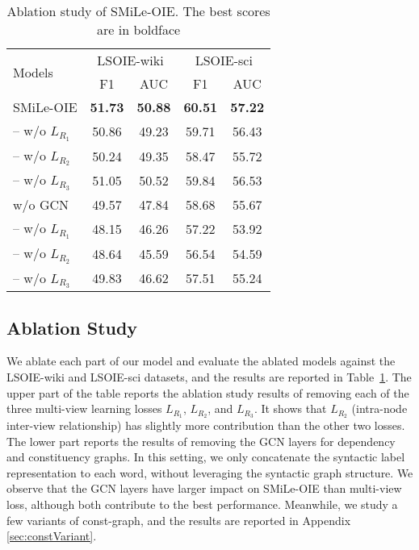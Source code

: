 \documentclass[11pt]{article}
\newcommand{\mname}{SMiLe-OIE\xspace}
\begin{document}
\begin{table}
\centering
    \begin{tabular}{l|cc|cc}
    \toprule
    \multirow{2}{*}{Models} &
    \multicolumn{2}{c|}{LSOIE-wiki} &
    \multicolumn{2}{c}{LSOIE-sci}\\
      & F1 & AUC & F1 & AUC\\
    \midrule
    \mname & \textbf{51.73} & \textbf{50.88} & \textbf{60.51} & \textbf{57.22}\\
    -- w/o $L_{R_1}$  & 50.86 & 49.23         & 59.71 & 56.43  \\
    -- w/o $L_{R_2}$ & 50.24 & 49.35         & 58.47 & 55.72      \\
    -- w/o $L_{R_3}$ & 51.05 & 50.52          & 59.84  & 56.53 \\
    \midrule
    w/o GCN  & 49.57 & 47.84         & 58.68 & 55.67     \\
    -- w/o $L_{R_1}$ & 48.15 & 46.26         & 57.22  &  53.92       \\
    -- w/o $L_{R_2}$ & 48.64 & 45.59         & 56.54  &  54.59     \\
    -- w/o $L_{R_3}$ & 49.83 & 46.62         & 57.51  & 55.24        \\
    \bottomrule
    \end{tabular}
\caption{Ablation study of \mname. The best scores are in boldface}
\label{tab:ablation}
\end{table}


\subsection{Ablation Study}
We ablate each part of our model and evaluate the ablated models against the LSOIE-wiki and LSOIE-sci datasets, and the results are reported in Table~\ref{tab:ablation}. 
The upper part of the table reports the ablation study results of removing each of the three multi-view learning losses $L_{R_1}$, $L_{R_2}$, and $L_{R_3}$. It shows that $L_{R_2}$ (intra-node inter-view relationship) has slightly more contribution than the other two losses. The lower part reports the results of removing
the GCN layers for dependency and constituency graphs. In this setting, we only concatenate the syntactic label representation to each word, without leveraging the syntactic graph structure. 
We observe that the GCN layers have larger impact on \mname than multi-view loss, although both contribute to the best performance. 
Meanwhile, we study a few variants of const-graph, and the results are reported in Appendix \ref{sec:constVariant}.
\end{document}

